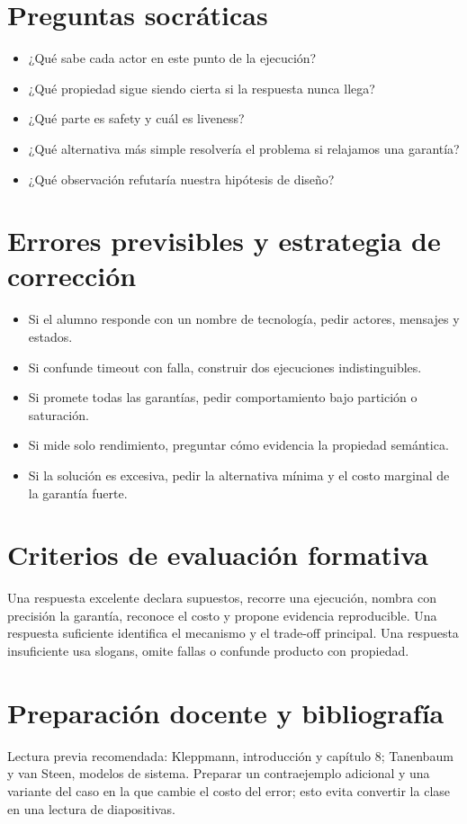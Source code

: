 \documentclass[variant=docente,cover=institutional,mode=screen]{ua-engineering-v6-article}
\begin{document}
\section{Preguntas socráticas}
\begin{itemize}
\item ¿Qué sabe cada actor en este punto de la ejecución?
\item ¿Qué propiedad sigue siendo cierta si la respuesta nunca llega?
\item ¿Qué parte es safety y cuál es liveness?
\item ¿Qué alternativa más simple resolvería el problema si relajamos una garantía?
\item ¿Qué observación refutaría nuestra hipótesis de diseño?
\end{itemize}

\section{Errores previsibles y estrategia de corrección}
\begin{itemize}
\item Si el alumno responde con un nombre de tecnología, pedir actores, mensajes y estados.
\item Si confunde timeout con falla, construir dos ejecuciones indistinguibles.
\item Si promete todas las garantías, pedir comportamiento bajo partición o saturación.
\item Si mide solo rendimiento, preguntar cómo evidencia la propiedad semántica.
\item Si la solución es excesiva, pedir la alternativa mínima y el costo marginal de la garantía fuerte.
\end{itemize}

\section{Criterios de evaluación formativa}
Una respuesta excelente declara supuestos, recorre una ejecución, nombra con precisión la garantía, reconoce el costo y propone evidencia reproducible. Una respuesta suficiente identifica el mecanismo y el trade-off principal. Una respuesta insuficiente usa slogans, omite fallas o confunde producto con propiedad.

\section{Preparación docente y bibliografía}
Lectura previa recomendada: Kleppmann, introducción y capítulo 8; Tanenbaum y van Steen, modelos de sistema. Preparar un contraejemplo adicional y una variante del caso en la que cambie el costo del error; esto evita convertir la clase en una lectura de diapositivas.
\end{document}
